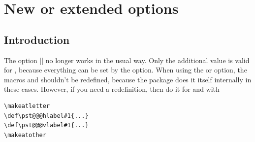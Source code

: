 \documentclass[11pt,english,BCOR=10mm,DIV=12,bibliography=totoc,parskip=false,headings=small,
    headinclude=false,footinclude=false,twoside]{pst-doc}
\begin{document}
\section{New or extended  options}
\subsection{Introduction}
The option || no longer works in the
usual way. Only the additional value  is valid for
, because everything can be set by the
 option. When using the  or
 option, the macros  and
 shouldn't be redefined, because the package does
it itself internally in these cases. However, if you need a
redefinition, then do it for  and
 with

\begin{lstlisting}[style=syntax]
\makeatletter
\def\pst@@@hlabel#1{...}
\def\pst@@@vlabel#1{...}
\makeatother
\end{lstlisting}
\end{document}
